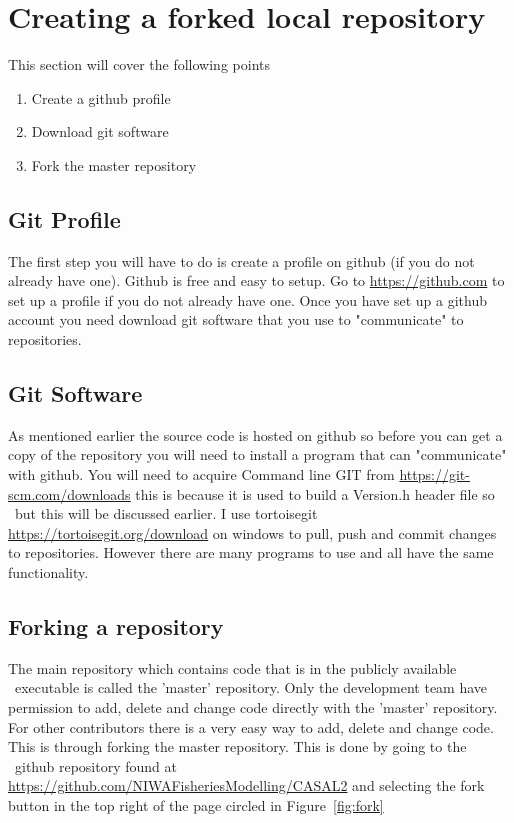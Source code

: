 \section{Creating a forked local repository\label{sec:local_repo}}
This section will cover the following points
\begin{enumerate}
	\item Create a github profile
	\item Download git software
	\item Fork the master repository
\end{enumerate}


\subsection{Git Profile}
The first step you will have to do is create a profile on github (if you do not already have one). Github is free and easy to setup. Go to \url{https://github.com} to set up a profile if you do not already have one. Once you have set up a github account you need download git software that you use to "communicate" to repositories.


\subsection{Git Software}
As mentioned earlier the source code is hosted on github so before you can get a copy of the repository you will need to install a program that can "communicate" with github. You will need to acquire Command line GIT from \url{https://git-scm.com/downloads} this is because it is used to build a Version.h header file so \CNAME\ but this will be discussed earlier. I use tortoisegit \url{https://tortoisegit.org/download} on windows to pull, push and commit changes to repositories. However there are many programs to use and all have the same functionality.

\subsection{Forking a repository}

The main repository which contains code that is in the publicly available \CNAME\ executable is called the 'master' repository. Only the development team have permission to add, delete and change code directly with the 'master' repository. For other contributors there is a very easy way to add, delete and change code. This is through forking the master repository. This is done by going to the \CNAME\ github repository found at \url{https://github.com/NIWAFisheriesModelling/CASAL2} and selecting the fork button in the top right of the page circled in Figure~\ref{fig:fork}

